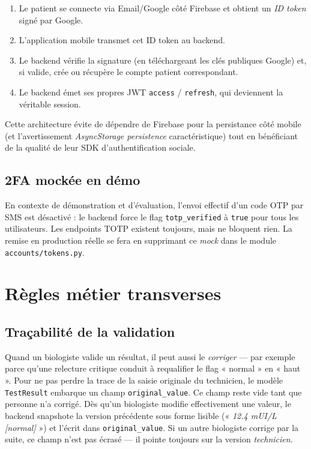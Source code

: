 \documentclass[12pt, a4paper, oneside]{report}
\begin{document}
\begin{enumerate}
  \item Le patient se connecte via Email/Google côté Firebase et
        obtient un \emph{ID token} signé par Google.
  \item L'application mobile transmet cet ID token au backend.
  \item Le backend vérifie la signature (en téléchargeant les clés
        publiques Google) et, si valide, crée ou récupère le compte
        patient correspondant.
  \item Le backend émet ses propres JWT \texttt{access} / \texttt{refresh},
        qui deviennent la véritable session.
\end{enumerate}

Cette architecture évite de dépendre de Firebase pour la persistance
côté mobile (et l'avertissement \emph{AsyncStorage persistence}
caractéristique) tout en bénéficiant de la qualité de leur SDK
d'authentification sociale.

\subsection{2FA mockée en démo}
En contexte de démonstration et d'évaluation, l'envoi effectif d'un
code OTP par SMS est désactivé : le backend force le flag
\texttt{totp\_verified} à \texttt{true} pour tous les utilisateurs.
Les endpoints TOTP existent toujours, mais ne bloquent rien. La
remise en production réelle se fera en supprimant ce \emph{mock}
dans le module \texttt{accounts/tokens.py}.

\section{Règles métier transverses}

\subsection{Traçabilité de la validation}
Quand un biologiste valide un résultat, il peut aussi le \emph{corriger}
— par exemple parce qu'une relecture critique conduit à requalifier le
flag « normal » en « haut ». Pour ne pas perdre la trace de la saisie
originale du technicien, le modèle \texttt{TestResult} embarque un
champ \texttt{original\_value}. Ce champ reste vide tant que personne
n'a corrigé. Dès qu'un biologiste modifie effectivement une valeur, le
backend snapshote la version précédente sous forme lisible
(« \textit{12.4 mUI/L [normal]} ») et l'écrit dans
\texttt{original\_value}. Si un autre biologiste corrige par la suite,
ce champ n'est pas écrasé — il pointe toujours sur la version
\emph{technicien}.
\end{document}
